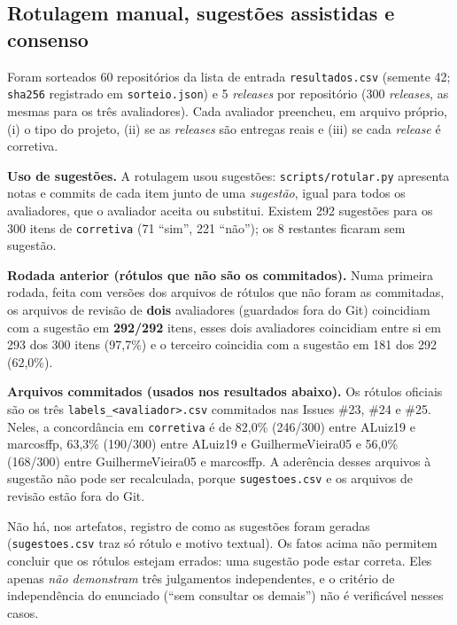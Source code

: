 \subsection{Rotulagem manual, sugestões assistidas e consenso}
Foram sorteados 60 repositórios da lista de entrada \texttt{resultados.csv} (semente 42; \texttt{sha256}
registrado em \texttt{sorteio.json}) e 5 \textit{releases} por repositório (300 \textit{releases}, as
mesmas para os três avaliadores). Cada avaliador preencheu, em arquivo próprio, (i) o tipo do projeto,
(ii) se as \textit{releases} são entregas reais e (iii) se cada \textit{release} é corretiva.

\textbf{Uso de sugestões.} A rotulagem usou sugestões: \texttt{scripts/rotular.py} apresenta notas e
commits de cada item junto de uma \emph{sugestão}, igual para todos os avaliadores, que o avaliador aceita
ou substitui. Existem 292 sugestões para os 300 itens de \texttt{corretiva} (71 ``sim'', 221 ``não''); os
8 restantes ficaram sem sugestão.

\textbf{Rodada anterior (rótulos que não são os commitados).} Numa primeira rodada, feita com versões dos
arquivos de rótulos que não foram as commitadas, os arquivos de revisão de \textbf{dois} avaliadores
(guardados fora do Git) coincidiam com a sugestão em \textbf{292/292} itens, esses dois avaliadores
coincidiam entre si em 293 dos 300 itens (97,7\%) e o terceiro coincidia com a sugestão em 181 dos 292
(62,0\%).

\textbf{Arquivos commitados (usados nos resultados abaixo).} Os rótulos oficiais são os três
\texttt{labels\_<avaliador>.csv} commitados nas Issues \#23, \#24 e \#25. Neles, a concordância em
\texttt{corretiva} é de 82,0\% (246/300) entre ALuiz19 e marcosffp, 63,3\% (190/300) entre ALuiz19 e
GuilhermeVieira05 e 56,0\% (168/300) entre GuilhermeVieira05 e marcosffp. A aderência desses arquivos à
sugestão não pode ser recalculada, porque \texttt{sugestoes.csv} e os arquivos de revisão estão fora do Git.

Não há, nos artefatos, registro de como as sugestões foram geradas (\texttt{sugestoes.csv} traz só rótulo
e motivo textual). Os fatos acima não permitem concluir que os rótulos estejam errados: uma sugestão
pode estar correta. Eles apenas \emph{não demonstram} três julgamentos independentes, e o critério de
independência do enunciado (``sem consultar os demais'') não é verificável nesses casos.

